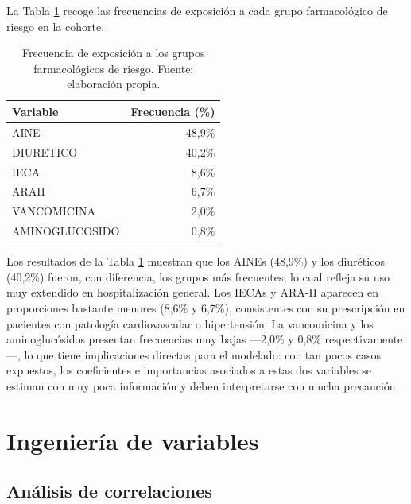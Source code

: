 \documentclass[12pt, a4paper, oneside]{report}
\begin{document}
La Tabla \ref{tab:farmacos} recoge las frecuencias de exposición a cada grupo farmacológico de riesgo en la cohorte.

\begin{table}[h]
    \centering
    \begin{tabular}{lr}
        \toprule
        \textbf{Variable} & \textbf{Frecuencia (\%)} \\
        \midrule
        AINE           & 48,9\% \\
        DIURETICO      & 40,2\% \\
        IECA           & 8,6\%  \\
        ARAII          & 6,7\%  \\
        VANCOMICINA    & 2,0\%  \\
        AMINOGLUCOSIDO & 0,8\%  \\
        \bottomrule
    \end{tabular}
    \caption{Frecuencia de exposición a los grupos farmacológicos de riesgo. Fuente: elaboración propia.}
    \label{tab:farmacos}
\end{table}

Los resultados de la Tabla \ref{tab:farmacos} muestran que los AINEs (48,9\%) y los diuréticos (40,2\%) fueron, con diferencia, los grupos más frecuentes, lo cual refleja su uso muy extendido en hospitalización general. Los IECAs y ARA-II aparecen en proporciones bastante menores (8,6\% y 6,7\%), consistentes con su prescripción en pacientes con patología cardiovascular o hipertensión. La vancomicina y los aminoglucósidos presentan frecuencias muy bajas —2,0\% y 0,8\% respectivamente—, lo que tiene implicaciones directas para el modelado: con tan pocos casos expuestos, los coeficientes e importancias asociados a estas dos variables se estiman con muy poca información y deben interpretarse con mucha precaución.

\section{Ingeniería de variables}

\subsection{Análisis de correlaciones}
\end{document}
